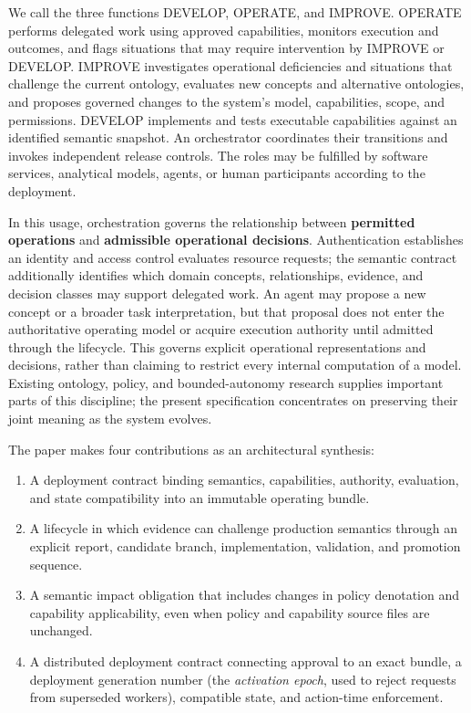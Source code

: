 \documentclass[preprint,12pt,authoryear]{elsarticle}
\providecommand{\tightlist}{\setlength{\itemsep}{0pt}\setlength{\parskip}{0pt}}
\begin{document}
We call the three functions DEVELOP, OPERATE, and IMPROVE. OPERATE
performs delegated work using approved capabilities, monitors execution
and outcomes, and flags situations that may require intervention by
IMPROVE or DEVELOP. IMPROVE investigates operational deficiencies and
situations that challenge the current ontology, evaluates new concepts
and alternative ontologies, and proposes governed changes to the
system's model, capabilities, scope, and permissions. DEVELOP implements
and tests executable capabilities against an identified semantic
snapshot. An orchestrator coordinates their transitions and invokes
independent release controls. The roles may be fulfilled by software
services, analytical models, agents, or human participants according to
the deployment.

In this usage, orchestration governs the relationship between
\textbf{permitted operations} and \textbf{admissible operational
decisions}. Authentication establishes an identity and access control
evaluates resource requests; the semantic contract additionally
identifies which domain concepts, relationships, evidence, and decision
classes may support delegated work. An agent may propose a new concept
or a broader task interpretation, but that proposal does not enter the
authoritative operating model or acquire execution authority until
admitted through the lifecycle. This governs explicit operational
representations and decisions, rather than claiming to restrict every
internal computation of a model. Existing ontology, policy, and
bounded-autonomy research supplies important parts of this discipline;
the present specification concentrates on preserving their joint meaning
as the system evolves.

The paper makes four contributions as an architectural synthesis:

\begin{enumerate}
\def\labelenumi{\arabic{enumi}.}
\tightlist
\item
  A deployment contract binding semantics, capabilities, authority,
  evaluation, and state compatibility into an immutable operating
  bundle.
\item
  A lifecycle in which evidence can challenge production semantics
  through an explicit report, candidate branch, implementation,
  validation, and promotion sequence.
\item
  A semantic impact obligation that includes changes in policy
  denotation and capability applicability, even when policy and
  capability source files are unchanged.
\item
  A distributed deployment contract connecting approval to an exact
  bundle, a deployment generation number (the \emph{activation epoch},
  used to reject requests from superseded workers), compatible state,
  and action-time enforcement.
\end{enumerate}
\end{document}
